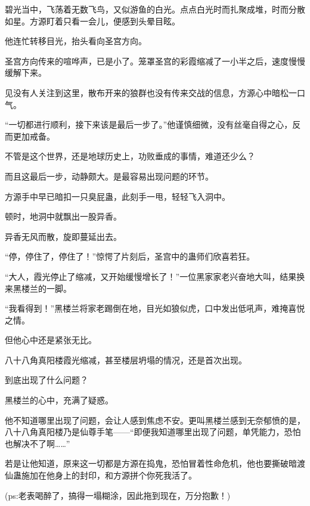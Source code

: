 \begin{this_body}
碧光当中，飞荡着无数飞鸟，又似游鱼的白光。点点白光时而扎聚成堆，时而分散如星。方源盯着只看一会儿，便感到头晕目眩。

他连忙转移目光，抬头看向圣宫方向。

圣宫方向传来的喧哗声，已是小了。笼罩圣宫的彩霞缩减了一小半之后，速度慢慢缓解下来。

见没有人关注到这里，散布开来的狼群也没有传来交战的信息，方源心中暗松一口气。

“一切都进行顺利，接下来该是最后一步了。”他谨慎细微，没有丝毫自得之心，反而更加戒备。

不管是这个世界，还是地球历史上，功败垂成的事情，难道还少么？

而且这最后一步，动静颇大。是最容易出现问题的环节。

方源手中早已暗扣一只臭屁蛊，此刻手一甩，轻轻飞入洞中。

顿时，地洞中就飘出一股异香。

异香无风而散，旋即蔓延出去。

“停，停住了，停住了！”惊愕了片刻后，圣宫中的蛊师们欣喜若狂。

“大人，霞光停止了缩减，又开始缓慢增长了！”一位黑家家老兴奋地大叫，结果换来黑楼兰的一脚。

“我看得到！”黑楼兰将家老踢倒在地，目光如狼似虎，口中发出低吼声，难掩喜悦之情。

但他心中还是紧张无比。

八十八角真阳楼霞光缩减，甚至楼层坍塌的情况，还是首次出现。

到底出现了什么问题？

黑楼兰的心中，充满了疑惑。

他不知道哪里出现了问题，会让人感到焦虑不安。更叫黑楼兰感到无奈郁愤的是，八十八角真阳楼乃是仙尊手笔——“即便我知道哪里出现了问题，单凭能力，恐怕也解决不了啊……”

若是让他知道，原来这一切都是方源在捣鬼，恐怕冒着性命危机，他也要撕破暗渡仙蛊施加在他身上的封印，和方源拼个你死我活了。

(ps:老表喝醉了，搞得一塌糊涂，因此拖到现在，万分抱歉！)

\end{this_body}

